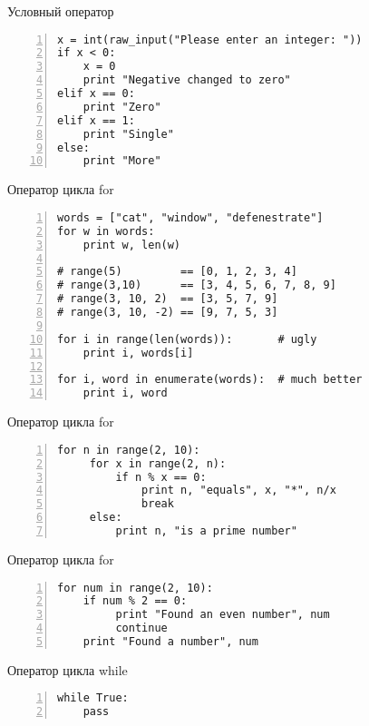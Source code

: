 \documentclass[hyperref={pdftex,unicode}]{beamer}
\begin{document}
\begin{frame}[fragile]{Условный оператор}
  \begin{lstlisting}[numbers=left]
x = int(raw_input("Please enter an integer: "))
if x < 0:
    x = 0
    print "Negative changed to zero"
elif x == 0:
    print "Zero"
elif x == 1:
    print "Single"
else:
    print "More"
  \end{lstlisting}
\end{frame}

\begin{frame}[fragile]{Оператор цикла for}
  \begin{lstlisting}[numbers=left]
words = ["cat", "window", "defenestrate"]
for w in words:
    print w, len(w)

# range(5)         == [0, 1, 2, 3, 4]
# range(3,10)      == [3, 4, 5, 6, 7, 8, 9]
# range(3, 10, 2)  == [3, 5, 7, 9]
# range(3, 10, -2) == [9, 7, 5, 3]

for i in range(len(words)):       # ugly
    print i, words[i]

for i, word in enumerate(words):  # much better
    print i, word

\end{lstlisting}
\end{frame}

\begin{frame}[fragile]{Оператор цикла for}
  \begin{lstlisting}[numbers=left]
for n in range(2, 10):
     for x in range(2, n):
         if n % x == 0:
             print n, "equals", x, "*", n/x
             break
     else:
         print n, "is a prime number"
  \end{lstlisting}
\end{frame}

\begin{frame}[fragile]{Оператор цикла for}
  \begin{lstlisting}[numbers=left]
for num in range(2, 10):
    if num % 2 == 0:
         print "Found an even number", num
         continue
    print "Found a number", num
  \end{lstlisting}
\end{frame}

\begin{frame}[fragile]{Оператор цикла while}
  \begin{lstlisting}[numbers=left]
while True:
    pass
  \end{lstlisting}
\end{frame}
\end{document}
